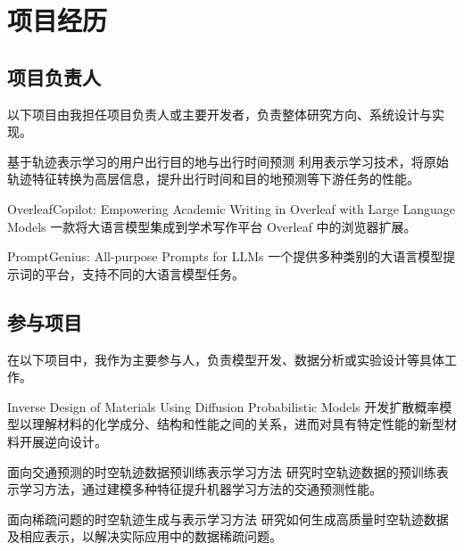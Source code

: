 \label{sec:projects}
\section*{项目经历}

\subsection*{项目负责人}
以下项目由我担任项目负责人或主要开发者，负责整体研究方向、系统设计与实现。

{基于轨迹表示学习的用户出行目的地与出行时间预测}
{}
{利用表示学习技术，将原始轨迹特征转换为高层信息，提升出行时间和目的地预测等下游任务的性能。}

{OverleafCopilot: Empowering Academic Writing in Overleaf with Large Language Models}
{}
{一款将大语言模型集成到学术写作平台 Overleaf 中的浏览器扩展。}

{PromptGenius: All-purpose Prompts for LLMs}
{}
{一个提供多种类别的大语言模型提示词的平台，支持不同的大语言模型任务。}

\subsection*{参与项目}
在以下项目中，我作为主要参与人，负责模型开发、数据分析或实验设计等具体工作。

{Inverse Design of Materials Using Diffusion Probabilistic Models}
{}
{开发扩散概率模型以理解材料的化学成分、结构和性能之间的关系，进而对具有特定性能的新型材料开展逆向设计。}

{面向交通预测的时空轨迹数据预训练表示学习方法}
{}
{研究时空轨迹数据的预训练表示学习方法，通过建模多种特征提升机器学习方法的交通预测性能。}

{面向稀疏问题的时空轨迹生成与表示学习方法}
{}
{研究如何生成高质量时空轨迹数据及相应表示，以解决实际应用中的数据稀疏问题。}
